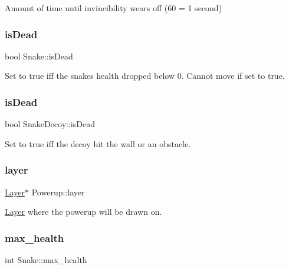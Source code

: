 Amount of time until invincibility wears off (60 = 1 second) 

\mbox{\label{group__snake_ga781e80a4c24c09fbe284d49097e6c334}} 
\subsubsection{\texorpdfstring{is\+Dead}{isDead}\hspace{0.1cm}{\footnotesize\ttfamily [1/2]}}
{\footnotesize\ttfamily bool Snake\+::is\+Dead}



Set to true iff the snake\textquotesingle{}s health dropped below 0. Cannot move if set to true. 

\mbox{\label{group__snake_ga825c2d7442b47b340bbf95bd42bc5435}} 
\subsubsection{\texorpdfstring{is\+Dead}{isDead}\hspace{0.1cm}{\footnotesize\ttfamily [2/2]}}
{\footnotesize\ttfamily bool Snake\+Decoy\+::is\+Dead}



Set to true iff the decoy hit the wall or an obstacle. 

\mbox{\label{group__snake_ga02754983ce605c249985e650d5023797}} 
\subsubsection{\texorpdfstring{layer}{layer}}
{\footnotesize\ttfamily \mbox{\hyperlink{struct_layer}{Layer}}$\ast$ Powerup\+::layer}



\mbox{\hyperlink{struct_layer}{Layer}} where the powerup will be drawn on. 

\mbox{\label{group__snake_ga1150d62946b0817287c3a23597993d08}} 
\subsubsection{\texorpdfstring{max\+\_\+health}{max\_health}}
{\footnotesize\ttfamily int Snake\+::max\+\_\+health}



